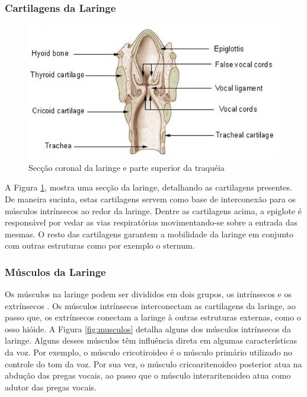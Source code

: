 \subsubsection{Cartilagens da Laringe }
\begin{figure}
	\centering
	\includegraphics[scale=0.5]{musculosCartilagens}
	\caption{Secção coronal da laringe e parte superior da traquéia}
	\label{fig:Cartilagens}
\end{figure}
A Figura \ref{fig:Cartilagens}, mostra uma secção da laringe, detalhando as cartilagens presentes.
De maneira sucinta, estas cartilagens servem como base de interconexão para os músculos intrínsecos ao redor da laringe. Dentre as cartilagens acima, a epiglote é responsável por vedar as vias respiratórias movimentando-se sobre a entrada das mesmas. O resto das cartilagens garantem a mobilidade da laringe em conjunto com outras estruturas como por exemplo o sternum.


\subsubsection{Músculos da Laringe}
Os músculos na laringe podem ser divididos em dois grupos, os intrínsecos e os extrínsecos \citealp{Giovanni20041}. Os músculos intrínsecos interconectam as cartilagens da laringe, ao passo que, os extrínsecos conectam a laringe à outras estruturas externas, como o osso hióide. A Figura \ref*{fig:musculos} detalha alguns dos músculos intrínsecos da laringe. Alguns desses músculos têm inﬂuência direta em algumas características da voz. Por exemplo, o músculo cricotiroideo é o músculo primário utilizado no controle do tom da voz. Por sua vez, o músculo cricoaritenoideo posterior atua na abdução das pregas vocais, ao passo que o músculo interaritenoideo atua como adutor das pregas vocais.

